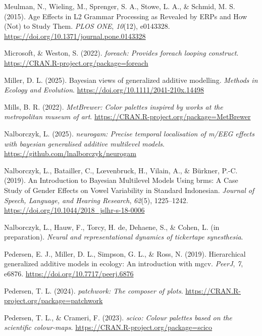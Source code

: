 \documentclass[
  doc,
  floatsintext,
  longtable,
  a4paper,
  nolmodern,
  notxfonts,
  notimes,
  colorlinks=true,linkcolor=blue,citecolor=blue,urlcolor=blue]{apa7}
\newlength{\cslhangindent}
\newenvironment{CSLReferences}[2] %
 {\begin{list}{}{%
  \setlength{\itemindent}{0pt}
  \setlength{\leftmargin}{0pt}
  \setlength{\parsep}{0pt}
  \ifodd #1
   \setlength{\leftmargin}{\cslhangindent}
   \setlength{\itemindent}{-1\cslhangindent}
  \fi
  \setlength{\itemsep}{#2\baselineskip}}}
 {\end{list}}
\begin{document}
\begin{CSLReferences}{1}{0}
Meulman, N., Wieling, M., Sprenger, S. A., Stowe, L. A., \& Schmid, M.
S. (2015). Age Effects in L2 Grammar Processing as Revealed by ERPs and
How (Not) to Study Them. \emph{PLOS ONE}, \emph{10}(12), e0143328.
\url{https://doi.org/10.1371/journal.pone.0143328}

Microsoft, \& Weston, S. (2022). \emph{{foreach}: Provides foreach
looping construct}. \url{https://CRAN.R-project.org/package=foreach}

Miller, D. L. (2025). Bayesian views of generalized additive modelling.
\emph{Methods in Ecology and Evolution}.
\url{https://doi.org/10.1111/2041-210x.14498}

Mills, B. R. (2022). \emph{{MetBrewer}: Color palettes inspired by works
at the metropolitan museum of art}.
\url{https://CRAN.R-project.org/package=MetBrewer}

Nalborczyk, L. (2025). \emph{{neurogam}: Precise temporal localisation
of m/EEG effects with bayesian generalised additive multilevel models}.
\url{https://github.com/lnalborczyk/neurogam}

Nalborczyk, L., Batailler, C., Lœvenbruck, H., Vilain, A., \& Bürkner,
P.-C. (2019). An Introduction to Bayesian Multilevel Models Using brms:
A Case Study of Gender Effects on Vowel Variability in Standard
Indonesian. \emph{Journal of Speech, Language, and Hearing Research},
\emph{62}(5), 1225--1242.
\url{https://doi.org/10.1044/2018_jslhr-s-18-0006}

Nalborczyk, L., Hauw, F., Torcy, H. de, Dehaene, S., \& Cohen, L. (in
preparation). \emph{Neural and representational dynamics of tickertape
synesthesia}.

Pedersen, E. J., Miller, D. L., Simpson, G. L., \& Ross, N. (2019).
Hierarchical generalized additive models in ecology: An introduction
with mgcv. \emph{PeerJ}, \emph{7}, e6876.
\url{https://doi.org/10.7717/peerj.6876}

Pedersen, T. L. (2024). \emph{{patchwork}: The composer of plots}.
\url{https://CRAN.R-project.org/package=patchwork}

Pedersen, T. L., \& Crameri, F. (2023). \emph{{scico}: Colour palettes
based on the scientific colour-maps}.
\url{https://CRAN.R-project.org/package=scico}


\end{CSLReferences}
\end{document}
